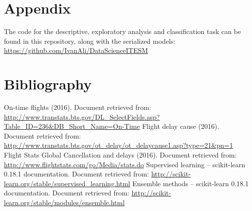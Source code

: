 \documentclass{article}
\begin{document}
	\section{Appendix}
	The code for the descriptive, exploratory analysis and classification task can be found in this repository, along with the serialized models: \url{https://github.com/IvanAli/DataScienceITESM}
    \section{Bibliography}
    On-time flights (2016). Document retrieved from: \url{http://www.transtats.bts.gov/DL\_SelectFields.asp?Table\_ID=236\&DB\_Short\_Name=On-Time}\newline\newline
    Flight delay cause (2016). Document retrieved from: \url{http://www.transtats.bts.gov/ot\_delay/ot\_delaycause1.asp?type=21\&pn=1}\newline\newline
    Flight Stats Global Cancellation and delays (2016). Document retrieved from:
	\url{http://www.flightstats.com/go/Media/stats.do}\newline\newline
	Supervised learning -- scikit-learn 0.18.1 documentation. Document retrieved from:
	\url{http://scikit-learn.org/stable/supervised_learning.html}\newline\newline
	Ensemble methods -- scikit-learn 0.18.1 documentation. Document retrieved from:
	\url{http://scikit-learn.org/stable/modules/ensemble.html}
\end{document}
